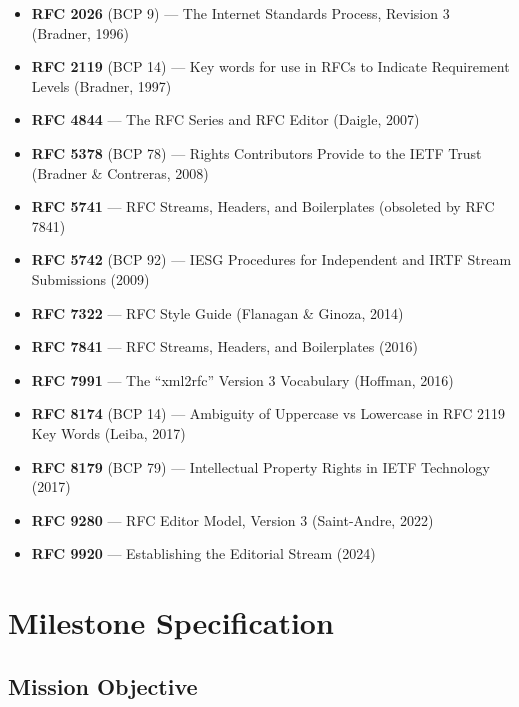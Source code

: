 \documentclass[11pt,letterpaper]{article}
\newcommand{\stageheader}[2]{%
  \noindent\colorbox{#2}{\makebox[\textwidth][l]{%
    \textcolor{white}{\bfseries\sffamily\hspace{6pt}#1\hspace{6pt}}}}%
  \vspace{0.5em}\par%
}
\begin{document}
\begin{itemize}[noitemsep]
  \item \textbf{RFC 2026} (BCP 9) --- The Internet Standards Process, Revision 3 (Bradner, 1996)
  \item \textbf{RFC 2119} (BCP 14) --- Key words for use in RFCs to Indicate Requirement Levels (Bradner, 1997)
  \item \textbf{RFC 4844} --- The RFC Series and RFC Editor (Daigle, 2007)
  \item \textbf{RFC 5378} (BCP 78) --- Rights Contributors Provide to the IETF Trust (Bradner \& Contreras, 2008)
  \item \textbf{RFC 5741} --- RFC Streams, Headers, and Boilerplates (obsoleted by RFC 7841)
  \item \textbf{RFC 5742} (BCP 92) --- IESG Procedures for Independent and IRTF Stream Submissions (2009)
  \item \textbf{RFC 7322} --- RFC Style Guide (Flanagan \& Ginoza, 2014)
  \item \textbf{RFC 7841} --- RFC Streams, Headers, and Boilerplates (2016)
  \item \textbf{RFC 7991} --- The ``xml2rfc'' Version 3 Vocabulary (Hoffman, 2016)
  \item \textbf{RFC 8174} (BCP 14) --- Ambiguity of Uppercase vs Lowercase in RFC 2119 Key Words (Leiba, 2017)
  \item \textbf{RFC 8179} (BCP 79) --- Intellectual Property Rights in IETF Technology (2017)
  \item \textbf{RFC 9280} --- RFC Editor Model, Version 3 (Saint-Andre, 2022)
  \item \textbf{RFC 9920} --- Establishing the Editorial Stream (2024)
\end{itemize}

\newpage

\stageheader{STAGE 3 --- MISSION PACKAGE}{tertiary}

\section{Milestone Specification}

\subsection{Mission Objective}
\end{document}
